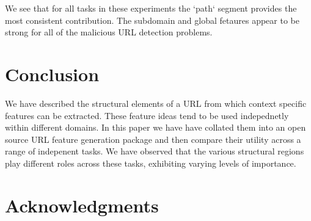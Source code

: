 \documentclass[sigconf]{acmart}
\begin{document}
We see that for all tasks in these experiments the `path` segment provides the most consistent contribution. The subdomain
and global fetaures appear to be strong for all of the malicious URL detection problems.

\section{Conclusion}

We have described the structural elements of a URL from which context specific features can be extracted.
These feature ideas tend to be used indepednetly within different domains. In this paper we have have 
collated them into an open source URL feature generation package and then compare their utility across a range
of indepenent tasks. We have observed that the various structural regions play different roles across 
these tasks, exhibiting varying levels of importance.  


\section{Acknowledgments}



\end{document}
